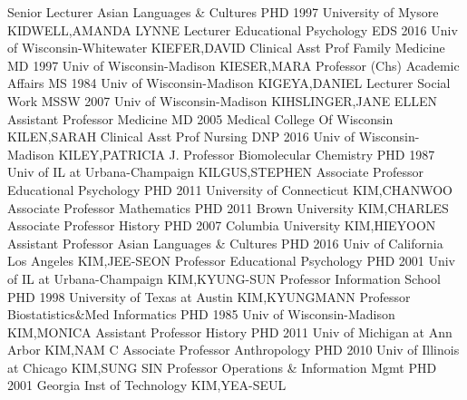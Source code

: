 \documentclass[
]{article}
\begin{document}
\textbar{}  \textbar Senior Lecturer \textbar Asian
Languages \& Cultures \textbar PHD 1997 University of Mysore
\textbar KIDWELL,AMANDA LYNNE \textbar{}  \textbar Lecturer
\textbar Educational Psychology \textbar EDS 2016 Univ of
Wisconsin-Whitewater \textbar KIEFER,DAVID \textbar{} 
\textbar Clinical Asst Prof \textbar Family Medicine \textbar MD 1997
Univ of Wisconsin-Madison \textbar KIESER,MARA \textbar{} 
\textbar Professor (Chs) \textbar Academic Affairs \textbar MS 1984 Univ
of Wisconsin-Madison \textbar KIGEYA,DANIEL \textbar{} 
\textbar Lecturer \textbar Social Work \textbar MSSW 2007 Univ of
Wisconsin-Madison \textbar KIHSLINGER,JANE ELLEN \textbar{} 
\textbar Assistant Professor \textbar Medicine \textbar MD 2005 Medical
College Of Wisconsin \textbar KILEN,SARAH \textbar{} 
\textbar Clinical Asst Prof \textbar Nursing \textbar DNP 2016 Univ of
Wisconsin-Madison \textbar KILEY,PATRICIA J. \textbar{} 
\textbar Professor \textbar Biomolecular Chemistry \textbar PHD 1987
Univ of IL at Urbana-Champaign \textbar KILGUS,STEPHEN \textbar{}
 \textbar Associate Professor \textbar Educational
Psychology \textbar PHD 2011 University of Connecticut
\textbar KIM,CHANWOO \textbar{}  \textbar Associate
Professor \textbar Mathematics \textbar PHD 2011 Brown University
\textbar KIM,CHARLES \textbar{}  \textbar Associate
Professor \textbar History \textbar PHD 2007 Columbia University
\textbar KIM,HIEYOON \textbar{}  \textbar Assistant
Professor \textbar Asian Languages \& Cultures \textbar PHD 2016 Univ of
California Los Angeles \textbar KIM,JEE-SEON \textbar{} 
\textbar Professor \textbar Educational Psychology \textbar PHD 2001
Univ of IL at Urbana-Champaign \textbar KIM,KYUNG-SUN \textbar{}
 \textbar Professor \textbar Information School \textbar PHD
1998 University of Texas at Austin \textbar KIM,KYUNGMANN \textbar{}
 \textbar Professor \textbar Biostatistics\&Med Informatics
\textbar PHD 1985 Univ of Wisconsin-Madison \textbar KIM,MONICA
\textbar{}  \textbar Assistant Professor \textbar History
\textbar PHD 2011 Univ of Michigan at Ann Arbor \textbar KIM,NAM C
\textbar{}  \textbar Associate Professor
\textbar Anthropology \textbar PHD 2010 Univ of Illinois at Chicago
\textbar KIM,SUNG SIN \textbar{}  \textbar Professor
\textbar Operations \& Information Mgmt \textbar PHD 2001 Georgia Inst
of Technology \textbar KIM,YEA-SEUL \textbar{} 
\end{document}
